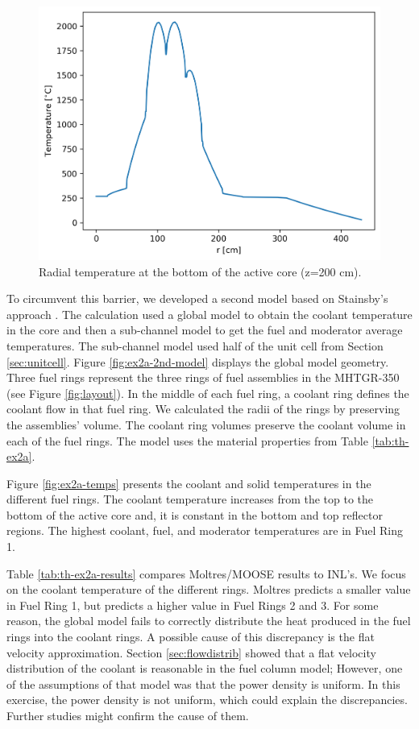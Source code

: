 \begin{figure}[htbp!]
  \centering
  \includegraphics[width=0.45\linewidth]{figures-thermal/ex2a-across}
  \hfill
  \caption{Radial temperature at the bottom of the active core (z=200 cm).}
  \label{fig:ex2a-1st-model-across}
\end{figure}

To circumvent this barrier, we developed a second model based on Stainsby's approach \cite{stainsby_investigation_2008}.
The calculation used a global model to obtain the coolant temperature in the core and then a sub-channel model to get the fuel and moderator average temperatures.
The sub-channel model used half of the unit cell from Section \ref{sec:unitcell}.
Figure \ref{fig:ex2a-2nd-model} displays the global model geometry.
Three fuel rings represent the three rings of fuel assemblies in the MHTGR-350 (see Figure \ref{fig:layout}).
In the middle of each fuel ring, a coolant ring defines the coolant flow in that fuel ring.
We calculated the radii of the rings by preserving the assemblies' volume.
The coolant ring volumes preserve the coolant volume in each of the fuel rings.
The model uses the material properties from Table \ref{tab:th-ex2a}.

Figure \ref{fig:ex2a-temps} presents the coolant and solid temperatures in the different fuel rings.
The coolant temperature increases from the top to the bottom of the active core and, it is constant in the bottom and top reflector regions.
The highest coolant, fuel, and moderator temperatures are in Fuel Ring 1.

Table \ref{tab:th-ex2a-results} compares Moltres/MOOSE results to INL's.
We focus on the coolant temperature of the different rings.
Moltres predicts a smaller value in Fuel Ring 1, but predicts a higher value in Fuel Rings 2 and 3.
For some reason, the global model fails to correctly distribute the heat produced in the fuel rings into the coolant rings.
A possible cause of this discrepancy is the flat velocity approximation.
Section \ref{sec:flowdistrib} showed that a flat velocity distribution of the coolant is reasonable in the fuel column model; However, one of the assumptions of that model was that the power density is uniform.
In this exercise, the power density is not uniform, which could explain the discrepancies.
Further studies might confirm the cause of them.

